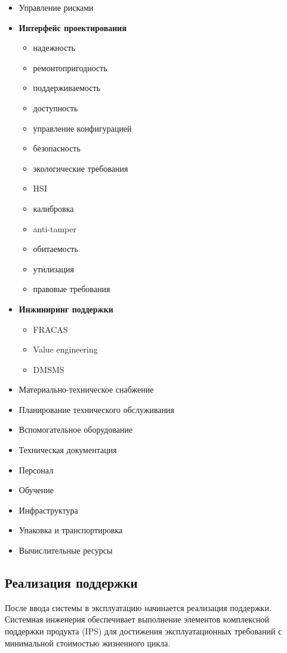 \documentclass[14pt,a4paper]{extarticle}
\begin{document}
\begin{itemize}
\item Управление рисками
\item \textbf{Интерфейс проектирования}
    \begin{itemize}
    \item надежность
    \item ремонтопригодность
    \item поддерживаемость
    \item доступность
    \item управление конфигурацией
    \item безопасность
    \item экологические требования
    \item HSI
    \item калибровка
    \item anti-tamper
    \item обитаемость
    \item утилизация
    \item правовые требования
    \end{itemize}
\item \textbf{Инжиниринг поддержки}
    \begin{itemize}
    \item FRACAS
    \item Value engineering
    \item DMSMS
    \end{itemize}
\item Материально-техническое снабжение
\item Планирование технического обслуживания
\item Вспомогательное оборудование
\item Техническая документация
\item Персонал
\item Обучение
\item Инфраструктура
\item Упаковка и транспортировка
\item Вычислительные ресурсы
\end{itemize}

\subsection{Реализация поддержки}

После ввода системы в эксплуатацию начинается реализация поддержки. Системная инженерия обеспечивает выполнение элементов комплексной поддержки продукта (IPS) для достижения эксплуатационных требований с минимальной стоимостью жизненного цикла.
\end{document}
